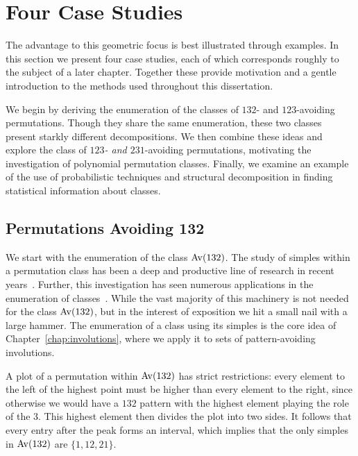 \section{Four Case Studies}


  The advantage to this geometric focus is best illustrated through 
  examples. In this section we present four case studies, each of which
  corresponds roughly to the subject of a later chapter. Together these provide
  motivation and a gentle introduction to the methods used throughout this
  dissertation.
  
  We begin by deriving the 
  enumeration of the classes of $132$- and $123$-avoiding permutations. Though
  they share the same enumeration, these two classes present starkly different
  decompositions. We then combine these ideas and explore the class of
  \emph{$123$- and $231$}-avoiding permutations, motivating the investigation
  of polynomial permutation classes. Finally, we examine an example of the use of
  probabilistic techniques and structural decomposition in finding
  statistical information about classes. 



  \subsection{Permutations Avoiding 132}
  \label{prelim:sec:av132}

    
    We start with the enumeration of the class $\operatorname{{Av}} (132)$.  The study of
    simples within a permutation class has been a deep and productive line of
    research in recent years~\cite{Brignall2008, Atkinson2005, Brignall2007}.  
    Further, this investigation has seen numerous applications in the
    enumeration of classes~\cite{pantone2013,pantone2014, Albert2012}.
    While the vast majority of this machinery is not needed for the class $\operatorname{{Av}}
    (132)$, but in the interest of exposition we hit a small nail with a large
    hammer.  The enumeration of a class using its simples is the core idea of
    Chapter~\ref{chap:involutions}, where we apply it to sets of
    pattern-avoiding involutions. 
    
    A plot of a permutation within $\operatorname{{Av}} (132)$ has strict restrictions: every
    element to the left of the highest point must be higher than every element
    to the right, since otherwise we would have a $132$ pattern with the
    highest element playing the role of the 3. This highest element then
    divides the plot into two sides. It follows that every entry after the
    peak forms an interval, which implies that the only simples in $\operatorname{{Av}} (132)$
    are $\{1, 12, 21\}$. 


